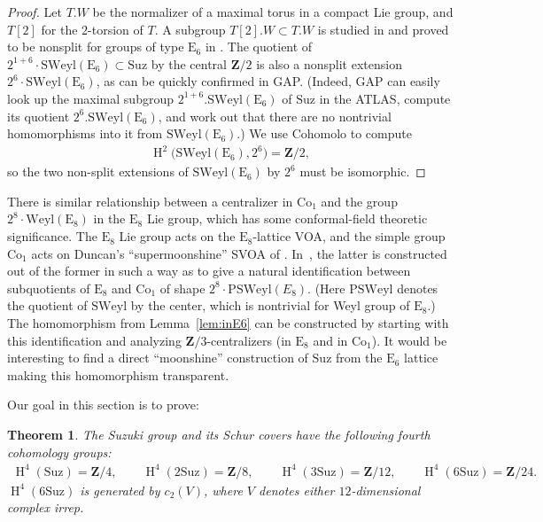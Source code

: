 \documentclass[pdftex]{sigma}
\numberwithin{equation}{section}
\newtheorem{Theorem}{Theorem}[section]
\newcommand\bZ{\mathbf Z}
\newcommand\rE{\mathrm E}
\DeclareMathOperator\homology{H}
\renewcommand\H{\homology}
\newcommand\<\langle
\renewcommand\>\rangle
\newcommand\Co{\mathrm{Co}}
\newcommand\Suz{\mathrm{Suz}}
\newcommand\SWeyl{\mathrm{SWeyl}}
\begin{document}
\begin{proof}Let $T.W$ be the normalizer of a maximal torus in a compact Lie group, and $T[2]$ for the $2$-torsion of $T$. A subgroup $T[2].W \subset T.W$ is studied in \cite{MR0206117} and proved to be nonsplit for groups of type $\mathrm{E}_6$ in \cite{MR0376956}.
{The quotient of $2^{1+6}\cdot\SWeyl (\rE_6) \subset \Suz$ by the central $\bZ/2$ is also a nonsplit extension $2^6 \cdot \SWeyl(\rE_6)$, as can be quickly confirmed in GAP. (Indeed, GAP can easily look up the maximal subgroup $2^{1+6}.\SWeyl(\rE_6)$ of $\Suz$ in the ATLAS, compute its quotient $2^6.\SWeyl(\rE_6)$, and work out that there are no nontrivial homomorphisms into it from $\SWeyl(\rE_6)$.)}
We use Cohomolo to compute
\begin{gather*}
\H^2\big(\SWeyl(\rE_6),2^6\big) = \bZ/2,
\end{gather*}
so the two non-split extensions of $\SWeyl(\rE_6)$ by $2^6$ must be isomorphic.
\end{proof}

\begin{Remark}There is similar relationship between a centralizer in $\Co_1$ and the group $2^8\cdot\mathrm{Weyl}(\mathrm{E}_8)$ in the $\mathrm{E}_8$ Lie group, which has some conformal-field theoretic significance. The $\mathrm{E}_8$ Lie group acts on the $\mathrm{E}_8$-lattice VOA, and the simple group $\Co_1$ acts on Duncan's ``supermoonshine'' SVOA of \cite{MR2352133, JohnDuncan-thesis}. In~\cite{JohnDuncan-thesis}, the latter is constructed out of the former in such a way as to give a natural identification between subquotients of $\mathrm{E}_8$ and $\Co_1$ of shape $2^8 \cdot \mathrm{PSWeyl}(E_8)$. (Here $\mathrm{PSWeyl}$ denotes the quotient of $\SWeyl$ by the center, which is nontrivial for Weyl group of $\mathrm{E}_8$.) The homomorphism from Lemma~\ref{lem:inE6} can be constructed by starting with this identification and analyzing $\bZ/3$-centralizers (in $\mathrm{E}_8$ and in $\Co_1$). It would be interesting to find a direct ``moonshine'' construction of $\Suz$ from the $\mathrm{E}_6$ lattice making this homomorphism transparent.
\end{Remark}

Our goal in this section is to prove:

\begin{Theorem}\label{thm:suz} The Suzuki group and its Schur covers have the following fourth cohomology groups:
 \begin{gather*} \H^4(\Suz) = \bZ/4, \qquad \H^4(2\Suz) = \bZ/8, \qquad \H^4(3\Suz) = \bZ/12, \qquad \H^4(6\Suz) = \bZ/24.\end{gather*}
 $\H^4(6\Suz)$ is generated by $c_2(V)$, where $V$ denotes either $12$-dimensional complex irrep.
\end{Theorem}
\end{document}
